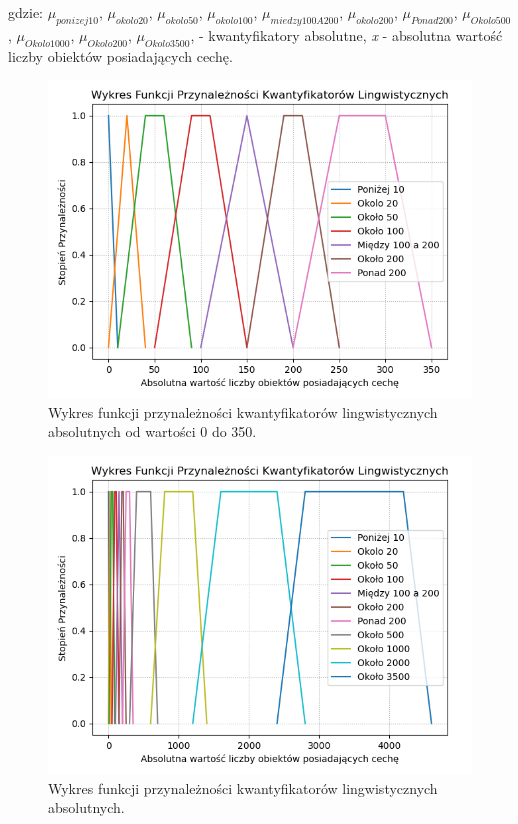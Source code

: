 \documentclass{classrep}
\begin{document}
gdzie: \(\mu _{ponizej10}\), \(\mu _{okolo20}\), \(\mu _{okolo50}\), \(\mu _{okolo100}\), \(\mu _{miedzy100A200}\), \(\mu _{okolo200}\), \(\mu _{Ponad200}\), \(\mu _{Okolo500}\), \(\mu _{Okolo1000}\), \(\mu _{Okolo200}\), \(\mu _{Okolo3500}\), - kwantyfikatory absolutne, \textit{x} - absolutna wartość liczby obiektów posiadających cechę.

\begin{figure}[h!]
\centering
\includegraphics[width=14cm]{kwantyfikatory_absolutny_2.png}
\vspace{-0.3cm}
\caption{Wykres funkcji przynależności kwantyfikatorów lingwistycznych absolutnych od wartości 0 do 350. }
\label{kwantyfikatory_lingwistyczne_absolutne}
\end{figure}


\begin{figure}[h!]
\centering
\includegraphics[width=14cm]{kwantyfikatory_absolutny.png}
\vspace{-0.3cm}
\caption{Wykres funkcji przynależności kwantyfikatorów lingwistycznych absolutnych. }
\label{kwantyfikatory_lingwistyczne_absolutne}
\end{figure}
\newpage
\end{document}
